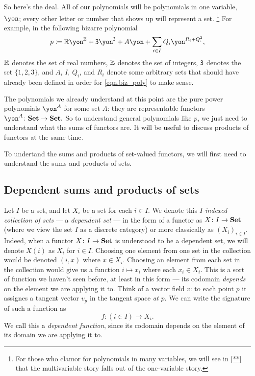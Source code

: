 \documentclass[Book-Poly]{subfiles}
\begin{document}
So here's the deal. All of our polynomials will be polynomials in one variable, $\yon$; every other letter or number that shows up will represent a set.%
\footnote{For those who clamor for polynomials in many variables, we will see in \cref{**} that the multivariable story falls out of the one-variable story.}
For example, in the following bizarre polynomial
\begin{equation}\label{eqn.biz_poly}
p\coloneqq\rr\yon^\zz+\3\yon^{\3}+A\yon+\sum_{i\in I}Q_i\yon^{R_i+Q_i^2},
\end{equation}
$\mathbb{R}$ denotes the set of real numbers, $\mathbb{Z}$ denotes the set of integers, $\textsf{3}$ denotes the set $\{1,2,3\}$, and $A$, $I$, $Q_i$, and $R_i$ denote some arbitrary sets that should have already been defined in order for \eqref{eqn.biz_poly} to make sense.

The polynomials we already understand at this point are the pure power polynomials $\yon^A$ for some set $A$: they are representable functors $\yon^A\colon\smset\to\smset.$
So to understand general polynomials like $p$, we just need to understand what the sums of functors are. It will be useful to discuss products of functors at the same time.

To undertand the sums and products of set-valued functors, we will first need to understand the sums and products of sets.

\subsection{Dependent sums and products of sets} \label{subsec.poly.func_nat.repr_sum.dep_sum_prod_set}

Let $I$ be a set, and let $X_i$ be a set for each $i\in I$. We denote this
\emph{$I$-indexed collection of sets} --- a \emph{dependent set} --- in the form of a functor as $X\colon I\to\mathbf{Set}$ (where we view the set $I$ as a discrete category) or more classically as $(X_i)_{i\in I}$.
Indeed, when a functor $X \colon I \to \mathbf{Set}$ is understood to be a dependent set, we will denote $X(i)$ as $X_i$ for $i \in I$.
Choosing one element from one set in the collection would be denoted $(i,x)$ where $x\in X_i$. Choosing an element from
each set in the collection would give us a function $i \mapsto x_i$ where each
$x_i\in X_i$. This is a sort of function we haven't seen before, at least in
this form --- its codomain \emph{depends} on the element we are applying it to.
Think of a vector field $v$: to each point $p$ it assignes a tangent vector
$v_p$ in the tangent space \emph{at $p$}. We can write the signature of such a
function as
\[f \colon (i \in I) \to X_i.\]
We call this a \emph{dependent function}, since its codomain depends on the
element of its domain we are applying it to.
\end{document}
